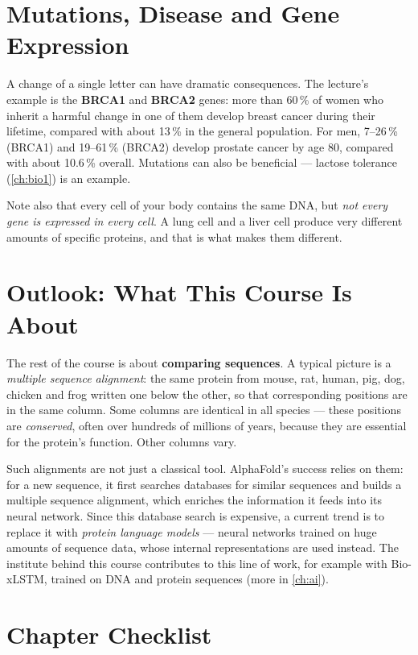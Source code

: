 \documentclass[11pt, oneside]{book}
\let\originalsection\section
\renewcommand{\section}{\Needspace{7\baselineskip}\originalsection}
\begin{document}
\section{Mutations, Disease and Gene Expression}
\label{sec:expression}

A change of a single letter can have dramatic consequences. The lecture's
example is the \textbf{BRCA1} and \textbf{BRCA2} genes: more than 60\,\% of
women who inherit a harmful change in one of them develop breast cancer during
their lifetime, compared with about 13\,\% in the general population. For men,
7--26\,\% (BRCA1) and 19--61\,\% (BRCA2) develop prostate cancer by age 80,
compared with about 10.6\,\% overall. Mutations can also be beneficial ---
lactose tolerance (\cref{ch:bio1}) is an example.

Note also that every cell of your body contains the same DNA, but \emph{not
every gene is expressed in every cell}. A lung cell and a liver cell
produce very different amounts of specific proteins, and that is what makes
them different.

\section{Outlook: What This Course Is About}
\label{sec:alphafold-msa}

The rest of the course is about \textbf{comparing sequences}. A typical
picture is a \emph{multiple sequence alignment}: the same protein from
mouse, rat, human, pig, dog, chicken and frog written one below the other, so
that corresponding positions are in the same column. Some columns are
identical in all species --- these positions are \emph{conserved}, often over
hundreds of millions of years, because they are essential for the protein's
function. Other columns vary.

Such alignments are not just a classical tool. AlphaFold's success relies on
them: for a new sequence, it first searches databases for similar sequences
and builds a multiple sequence alignment, which enriches the information it
feeds into its neural network. Since this database search is expensive, a
current trend is to replace it with \emph{protein language models} --- neural
networks trained on huge amounts of sequence data, whose internal
representations are used instead. The institute behind this course
contributes to this line of work, for example with Bio-xLSTM, trained on DNA
and protein sequences (more in \cref{ch:ai}).

\section{Chapter Checklist}
\end{document}
